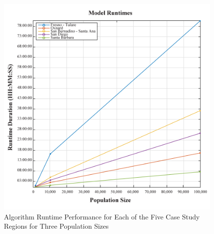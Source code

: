     \begin{figure}[!h]
        \begin{center}
        \includegraphics[width=5.5in]{figures/Runtimes.png}
        \caption{Algorithm Runtime Performance for Each of the Five Case Study Regions for Three Population Sizes}
        \label{fig:Runtimes}
        \end{center}
    \end{figure}
    
